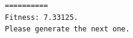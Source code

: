 \documentclass{article}
\theoremstyle{plain}
\theoremstyle{definition}
\theoremstyle{remark}
\begin{document}
\begin{lstlisting}
==========
Fitness: 7.33125.
Please generate the next one.
\end{lstlisting}



    


\end{document}
